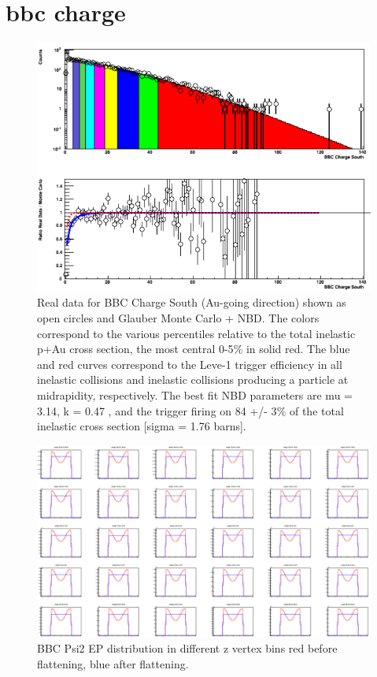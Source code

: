 \section{bbc charge}
\begin{figure}[!h]
\begin{center}
\includegraphics[width=0.65\linewidth]{figs/centrality_determination.png}
\caption{Real data for BBC Charge South (Au-going direction) shown as open circles and Glauber Monte Carlo + NBD. The colors correspond to the various
percentiles relative to the total inelastic p+Au cross section, the most central 0-5$\%$ in solid red. The blue and red curves correspond to the Leve-1 trigger
efficiency in all inelastic collisions and inelastic collisions producing a particle at midrapidity, respectively. The best fit NBD parameters are mu = 3.14, k = 0.47
, and the trigger firing on 84 +/- 3$\%$ of the total inelastic cross section [sigma = 1.76 barns].}
\end{center}
\end{figure}
\begin{figure}[!h]
\begin{center}
\includegraphics[width=0.65\linewidth]{figs/bbc_ep_bf_af.png}
\caption{BBC Psi2 EP distribution in different z vertex bins red before flattening, blue after flattening.}
\end{center}
\end{figure}
